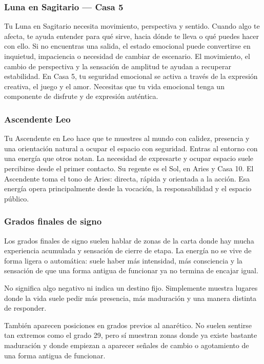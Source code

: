 \documentclass[11pt,a4paper]{article}\usepackage[utf8]{inputenc}
\begin{document}
\subsubsection*{Luna en Sagitario — Casa 5}
Tu Luna en Sagitario necesita movimiento, perspectiva y sentido. Cuando algo te afecta, te ayuda entender para qué sirve, hacia dónde te lleva o qué puedes hacer con ello. Si no encuentras una salida, el estado emocional puede convertirse en inquietud, impaciencia o necesidad de cambiar de escenario. El movimiento, el cambio de perspectiva y la sensación de amplitud te ayudan a recuperar estabilidad. En Casa 5, tu seguridad emocional se activa a través de la expresión creativa, el juego y el amor. Necesitas que tu vida emocional tenga un componente de disfrute y de expresión auténtica.

\subsubsection*{Ascendente Leo}
Tu Ascendente en Leo hace que te muestres al mundo con calidez, presencia y una orientación natural a ocupar el espacio con seguridad. Entras al entorno con una energía que otros notan. La necesidad de expresarte y ocupar espacio suele percibirse desde el primer contacto. Su regente es el Sol, en Aries y Casa 10. El Ascendente toma el tono de Aries: directa, rápida y orientada a la acción. Esa energía opera principalmente desde la vocación, la responsabilidad y el espacio público.

\subsubsection*{Grados finales de signo}
Los grados finales de signo suelen hablar de zonas de la carta donde hay mucha experiencia acumulada y sensación de       cierre de etapa. La energía no se vive de forma ligera o automática: suele haber más intensidad, más consciencia y la sensación de que una forma antigua de funcionar ya no termina de encajar igual.

No significa algo negativo ni indica un destino fijo. Simplemente muestra lugares donde la vida suele pedir más presencia, más maduración y una manera distinta de responder.

También aparecen posiciones en grados previos al anarético. No suelen sentirse tan extremos como el grado 29, pero sí muestran zonas donde ya existe bastante maduración y donde empiezan a aparecer señales de cambio o agotamiento de una forma antigua de funcionar.
\end{document}
